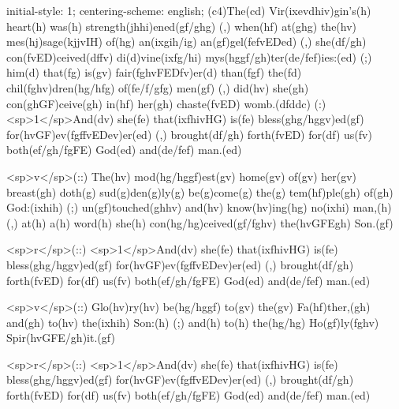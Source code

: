 initial-style: 1;
centering-scheme: english;
(c4)The(cd) Vir(ixevdhiv)gin's(h) heart(h) was(h) strength(jhhi)ened(gf/ghg) (,) when(hf) at(ghg) the(hv) mes(hj)sage(kjjvIH) of(hg) an(ixgih/ig) an(gf)gel(fefvEDed) (,) she(df/gh) con(fvED)ceived(dffv) di(d)vine(ixfg/hi) mys(hggf/gh)ter(de/fef)ies:(ed) (;) him(d) that(fg) is(gv) fair(fghvFEDfv)er(d) than(fgf) the(fd) chil(fghv)dren(hg/hfg) of(fe/f/gfg) men(gf) (,) did(hv) she(gh) con(ghGF)ceive(gh) in(hf) her(gh) chaste(fvED) womb.(dfddc) (:) <sp>1</sp>And(dv) she(fe) that(ixfhivHG) is(fe) bless(ghg/hggv)ed(gf) for(hvGF)ev(fgffvEDev)er(ed) (,) brought(df/gh) forth(fvED) for(df) us(fv) both(ef/gh/fgFE) God(ed) and(de/fef) man.(ed)

<sp>v</sp>(::) The(hv) mod(hg/hggf)est(gv) home(gv) of(gv) her(gv) breast(gh) doth(g) sud(g)den(g)ly(g) be(g)come(g) the(g) tem(hf)ple(gh) of(gh) God:(ixhih) (;) un(gf)touched(ghhv) and(hv) know(hv)ing(hg) no(ixhi) man,(h) (,) at(h) a(h) word(h) she(h) con(hg/hg)ceived(gf/fghv) the(hvGFEgh) Son.(gf)

<sp>r</sp>(::) <sp>1</sp>And(dv) she(fe) that(ixfhivHG) is(fe) bless(ghg/hggv)ed(gf) for(hvGF)ev(fgffvEDev)er(ed) (,) brought(df/gh) forth(fvED) for(df) us(fv) both(ef/gh/fgFE) God(ed) and(de/fef) man.(ed)

<sp>v</sp>(::) Glo(hv)ry(hv) be(hg/hggf) to(gv) the(gv) Fa(hf)ther,(gh) and(gh) to(hv) the(ixhih) Son:(h) (;) and(h) to(h) the(hg/hg) Ho(gf)ly(fghv) Spir(hvGFE/gh)it.(gf)

<sp>r</sp>(::) <sp>1</sp>And(dv) she(fe) that(ixfhivHG) is(fe) bless(ghg/hggv)ed(gf) for(hvGF)ev(fgffvEDev)er(ed) (,) brought(df/gh) forth(fvED) for(df) us(fv) both(ef/gh/fgFE) God(ed) and(de/fef) man.(ed)